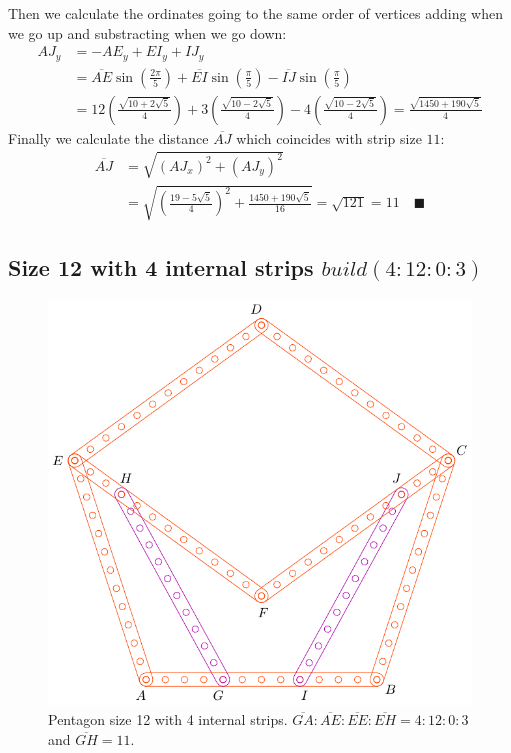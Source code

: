 \documentclass[11pt]{article}
\begin{document}
Then we calculate the ordinates going to the same order of vertices adding when we go up and substracting when we go down:
\begin{align}
AJ_y &= -AE_y + EI_y + IJ_y\nonumber\\
 &= \overline{AE}\sin\left(\frac{2\pi}5\right)
 + \overline{EI}\sin\left(\frac{\pi}5\right) 
 - \overline{IJ}\sin\left(\frac{\pi}5\right)\nonumber\\
 &= 12\left(\frac{\sqrt{10+2\sqrt5}}4\right)
 + 3\left(\frac{\sqrt{10-2\sqrt5}}4\right)
 - 4\left(\frac{\sqrt{10-2\sqrt5}}4\right)%
 = \frac{\sqrt{1450+190\sqrt5}}4
\end{align}
Finally we calculate the distance $\overline{AJ}$ which coincides with strip size $11$:
\begin{align}
\overline{AJ} &= \sqrt{(AJ_x)^2 + (AJ_y)^2}\nonumber\\
 &= \sqrt{\left(\frac{19-5\sqrt5}4\right)^2 + \frac{1450+190\sqrt5}{16}}%
 = \sqrt{121} = 11 \quad\blacksquare
\end{align}

\subsection{Size 12 with 4 internal strips $build(4:12:0:3)$}

\begin{figure}[H]
 \centering
 \includegraphics[scale=0.8]{12/penta12b}
 \caption{Pentagon size 12 with 4 internal strips. $\overline{GA}:\overline{AE}:\overline{EE}:\overline{EH} = 4:12:0:3$ and $\overline{GH}=11$.}
 \label{fig:penta12b}
\end{figure}
\end{document}
